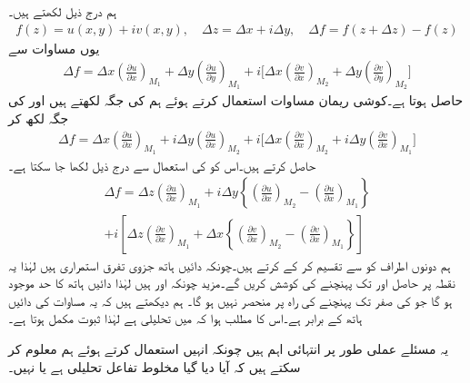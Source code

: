 ہم درج ذیل لکھتے ہیں۔
\begin{align*}
f(z)=u(x,y)+iv(x,y),\quad \Delta z=\Delta x+i\Delta y,\quad \Delta f=f(z+\Delta z)-f(z)
\end{align*}
یوں مساوات  سے
\begin{align*}
\Delta f=\Delta x\left(\frac{\partial u}{\partial x}\right)_{M_1}+\Delta y\left(\frac{\partial u}{\partial y}\right)_{M_1}+i\big[\Delta x\left(\frac{\partial v}{\partial x}\right)_{M_2}+\Delta y\left(\frac{\partial v}{\partial y}\right)_{M_2}\big]
\end{align*}
حاصل ہوتا ہے۔کوشی ریمان مساوات استعمال کرتے ہوئے ہم  کی جگہ  لکھتے ہیں اور  کی جگہ  لکھ کر
\begin{align*}
\Delta f=\Delta x\left(\frac{\partial u}{\partial x}\right)_{M_1}+i\Delta y\left(\frac{\partial u}{\partial x}\right)_{M_2}+i\big[\Delta x\left(\frac{\partial v}{\partial x}\right)_{M_2}+i\Delta y\left(\frac{\partial v}{\partial x}\right)_{M_1}\big]
\end{align*}
حاصل کرتے ہیں۔اس کو  کی استعمال سے درج ذیل لکھا جا سکتا ہے۔
\begin{multline*}
\Delta f=\Delta z\left(\frac{\partial u}{\partial x}\right)_{M_1}+i\Delta y\left\{\left(\frac{\partial u}{\partial x}\right)_{M_2}-\left(\frac{\partial u}{\partial x}\right)_{M_1}\right\}\\
+i\left[\Delta z\left(\frac{\partial v}{\partial x}\right)_{M_1}+\Delta x\left\{\left(\frac{\partial v}{\partial x}\right)_{M_2}-\left(\frac{\partial v}{\partial x}\right)_{M_1}\right\}\right]
\end{multline*}
ہم دونوں اطراف کو  سے تقسیم کر کے  کرتے ہیں۔چونکہ دائیں ہاتھ جزوی تفرق استمراری ہیں لہٰذا یہ نقطہ  پر حاصل  اور  تک پہنچنے کی کوشش کریں گے۔مزید چونکہ  اور  ہیں لہٰذا دائیں ہاتھ کا حد موجود ہو گا جو  کی صفر تک پہنچنے کی راہ پر منحصر نہیں ہو گا۔ ہم دیکھتے ہیں کہ یہ مساوات   کی دائیں ہاتھ کے برابر ہے۔اس کا مطلب ہوا کہ  میں  تحلیلی ہے لہٰذا ثبوت مکمل ہوتا ہے۔

یہ مسئلے عملی طور پر  انتہائی اہم ہیں چونکہ انہیں استعمال کرتے ہوئے ہم معلوم کر سکتے ہیں کہ آیا دیا گیا مخلوط تفاعل تحلیلی ہے یا نہیں۔

